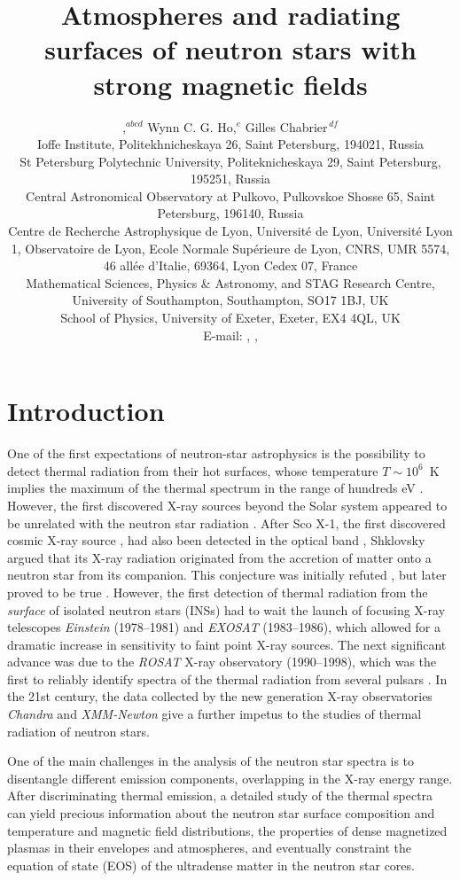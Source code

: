 \documentclass{pos1}
\title{Atmospheres and radiating surfaces of neutron stars 
with strong magnetic fields}
\author{\speaker{Alexander Y. Potekhin},$^{abcd}$
   Wynn C. G. Ho,$^{e}$
   Gilles Chabrier$^{\,df}$
\\
\llap{$^a$}Ioffe Institute,
      Politekhnicheskaya 26, Saint Petersburg, 194021,
       Russia\\
\llap{$^b$}St Petersburg Polytechnic University,
      Politeknicheskaya 29, Saint Petersburg, 195251,
       Russia\\
\llap{$^c$}Central Astronomical Observatory at Pulkovo,
      Pulkovskoe Shosse 65, Saint Petersburg, 196140,
       Russia\\
\llap{$^d$}Centre de Recherche Astrophysique de Lyon, Universit\'e de
Lyon, Universit\'e Lyon 1, Observatoire de Lyon, Ecole Normale
Sup\'erieure de Lyon, CNRS, UMR 5574, 46 all\'ee d'Italie,
69364, Lyon Cedex 07, France\\
\llap{$^e$}Mathematical Sciences, Physics \& Astronomy, and STAG Research
Centre, University of Southampton, Southampton,
SO17 1BJ, UK\\
\llap{$^f$}School of Physics, University of Exeter, Exeter, EX4 4QL, UK
\\
E-mail: \email{palex@astro.ioffe.ru},
 \email{wynnho@slac.stanford.edu},
 \email{gilles.chabrier@ens-lyon.fr}
}
\begin{document}
\section{Introduction}

One of the first expectations of neutron-star astrophysics is the
possibility to detect thermal radiation from their hot surfaces, whose
temperature $T \sim10^6$~K implies the maximum of the thermal spectrum
in the range of hundreds eV \cite{Tsuruta64,Chiu64}. However, the
first discovered X-ray sources beyond the Solar system
\cite{Giacconi_ea62,Bowyer_ea64a,Bowyer_ea64b} appeared to be
unrelated with the neutron star radiation \cite{Bowyer_ea64b}. After
Sco X-1, the first discovered cosmic X-ray source
\cite{Giacconi_ea62}, had also been detected in the optical band
\cite{Sandage_ea66}, Shklovsky \cite{Shklovsky67} argued that its
X-ray radiation originated from the accretion of matter onto a neutron
star from its companion. This conjecture was initially refuted
\cite{CameronScoX1}, but later proved to be true \cite{deFreitas77}.
However, the first detection of thermal radiation from the
\emph{surface} of isolated neutron stars (INSs)
\cite{ChengHelfand83,BrinkmannOgelman87} had to wait the launch of
focusing X-ray telescopes \textit{Einstein} (1978--1981) and
\textit{EXOSAT} (1983--1986), which allowed for a dramatic increase in
sensitivity to faint point X-ray sources. The next significant advance
was due to the \textit{ROSAT} X-ray observatory (1990--1998),
which was the first to reliably identify spectra of the thermal
radiation from several pulsars
\cite{Ogelman95,Becker99}. In the 21st century, the data collected by
the new generation X-ray observatories \textit{Chandra} and
\textit{XMM-Newton} give a further impetus to the studies of thermal
radiation of neutron stars.

One of the main challenges in the analysis of the neutron star spectra
is to disentangle different emission components, overlapping in the
X-ray energy range. After discriminating thermal emission, a detailed
study of the  thermal spectra can yield precious information about the
neutron star surface composition and temperature and magnetic field
distributions, the properties of dense
magnetized plasmas in their envelopes and atmospheres, and eventually
constraint the equation of state (EOS) of the ultradense matter in the
neutron star cores. 
\end{document}
